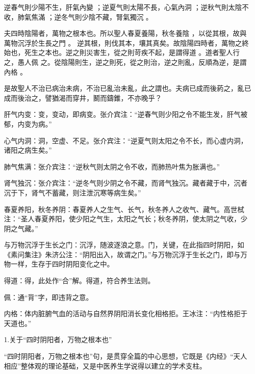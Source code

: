 \documentclass[draft,12pt]{ctexbook}
\begin{document}

\begin{yuanwen}
逆春气則少陽不生，肝氣內變 ；逆夏气則太陽不長，心氣內洞 ；逆秋气則太陰不收，肺氣焦滿 ；逆冬气則少陰不藏，腎氣獨沉 。

夫四時陰陽者，萬物之根本也。所以聖人春夏養陽，秋冬養陰 ，以從其根，故與萬物沉浮於生長之門 。 逆其根，則伐其本，壤其真矣。故陰陽四時者，萬物之終始也，死生之本也。逆之則災害生，從之則苛疾不起，是謂得道 。道者聖人行之，愚人佩 之。從陰陽則生，逆之則死，從之則治，逆之則亂，反順為逆，是謂內格 。

是故聖人不治已病治未病，不治已亂治未亂，此之謂也。夫病已成而後葯之，亂已成而後治之，譬猶渴而穿井，鬭而鑄錐，不亦晚乎？
\end{yuanwen}


\begin{jiaozhu}
  \item 肝气内变：变，变动，即病变。张介宾注：“逆春气则少阳之令不能生发，肝气被郁，内变为病。”
  \item 心气内洞：洞，空虚、不足。张介宾注：“逆夏气则太阳之令不长，而心虚内洞，诸阳之病生矣。”
  \item 肺气焦满：张介宾注：“逆秋气则太阴之令不收，而肺热叶焦为胀满也。”
  \item 肾气独沉：张介宾注：“逆冬气则少阴之令不藏，而肾气独沉。藏者藏于中，沉者沉于下，肾气不蓄藏，则注泄沉寒等病生矣。”
  \item 春夏养阳，秋冬养阴：春夏养人之生气、长气，秋冬养人之收气、藏气。高世栻注：“圣人春夏养阳，使少阳之气生，太阳之气长；秋冬养阴，使太阴之气收，少阴之气藏。”
  \item 与万物沉浮于生长之门：沉浮，随波逐浪之意。门，关键，在此指四时阴阳，如《素问集注》朱济公注：“阴阳出入，故谓之门。”与万物沉浮于生长之门，即与万物一样，生存于四时阴阳变化之中。
  \item 得道：得，此处作“合”解。得道，符合养生法则。
  \item 佩：通“背”字，即违背之意。
  \item 内格：体内脏腑气血的活动与自然界阴阳消长变化相格拒。王冰注：“内性格拒于天道也。”
\end{jiaozhu}


1.关于“四时阴阳者，万物之根本也”

“四时阴阳者，万物之根本也”句，是贯穿全篇的中心思想，它既是《内经》“天人相应”整体观的理论基础，又是中医养生学说得以建立的学术支柱。
\end{document}
